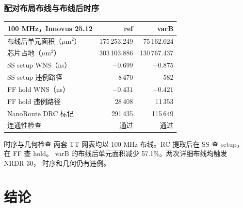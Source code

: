 \documentclass[10pt,aspectratio=43,mathserif]{beamer}
\begin{document}
\begin{frame}[t]
\frametitle{\textbf{配对布局布线与布线后时序}}
\footnotesize
\begin{center}
\begin{tabular}{lrr}
  \toprule
  100 MHz，Innovus 25.12 & ref & varB \\
  \midrule
  布线后单元面积（$\mu$m$^2$） & 175\,253.249 & 75\,162.024 \\
  芯片占地（$\mu$m$^2$） & 303\,103.886 & 130\,767.437 \\
  SS setup WNS（ns） & $-0.699$ & $-0.875$ \\
  SS setup 违例路径 & 8\,470 & 582 \\
  FF hold WNS（ns） & $-0.431$ & $-0.421$ \\
  FF hold 违例路径 & 28\,408 & 11\,353 \\
  NanoRoute DRC 标记 & 291\,435 & 115\,649 \\
  连通性检查 & 通过 & 通过 \\
  \bottomrule
\end{tabular}
\end{center}
\begin{block}{时序与几何检查}
  两套 TT 网表均以 100 MHz 布线。RC 提取后在 SS 查 setup，在 FF 查 hold。
  varB 的布线后单元面积减少 57.1\%。两次详细布线均触发 NRDR-30，
  时序和几何仍有违例。
\end{block}
\end{frame}

\section[结论]{结论}
\end{document}
